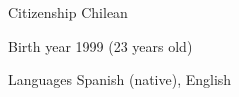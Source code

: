
\begin{cvskills}

	\cvskill
	{Citizenship}
    {Chilean}

	\cvskill
	{Birth year}
    {1999 (23 years old)}

	\cvskill
	{Languages}
    {Spanish (native), English}

\end{cvskills}
